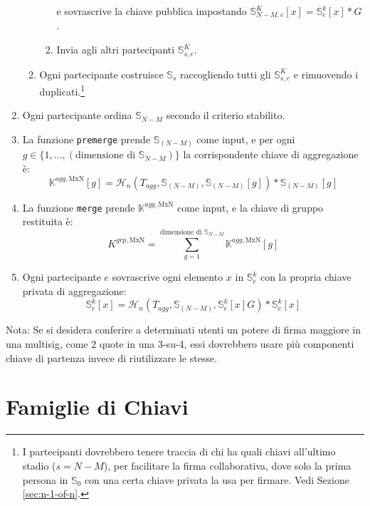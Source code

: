 \begin{enumerate}
\begin{enumerate}
\begin{enumerate}
            e sovrascrive la chiave pubblica impostando $\mathbb{S}^K_{N-M,e}[x] = \mathbb{S}^{k}_{e}[x]*G$.
            \item Invia agli altri partecipanti $\mathbb{S}^K_{s,e}$.
        \end{enumerate}
        \item Ogni partecipante costruisce $\mathbb{S}_{s}$ raccogliendo tutti gli $\mathbb{S}^K_{s,e}$ e rimuovendo i duplicati.\footnote{I partecipanti dovrebbero tenere traccia di chi ha quali chiavi all'ultimo stadio ($s = N-M$), per facilitare la firma collaborativa, dove solo la prima persona in $\mathbb{S}_0$ con una certa chiave privata la usa per firmare. Vedi Sezione \ref{sec:n-1-of-n}.}
    \end{enumerate}
    \item Ogni partecipante ordina $\mathbb{S}_{N-M}$ secondo il criterio stabilito.
    \item La funzione {\tt premerge} prende $\mathbb{S}_{(N-M)}$ come input, e per ogni \(g \in \{1,...,(\textrm{dimensione di }\mathbb{S}_{N-M})\}\) la corrispondente chiave di aggregazione è:\vspace{.175cm}
    \[\mathbb{K}^{agg,\textrm{MxN}}[g] = \mathcal{H}_n(T_{agg},\mathbb{S}_{(N-M)},\mathbb{S}_{(N-M)}[g])*\mathbb{S}_{(N-M)}[g]\]
    \item La funzione {\tt merge} prende $\mathbb{K}^{agg,\textrm{MxN}}$ come input, e la chiave di gruppo restituita è:\vspace{.175cm}
    \[K^{grp,\textrm{MxN}} = \sum^{\textrm{dimensione di }\mathbb{S}_{N-M}}_{g = 1} \mathbb{K}^{agg,\textrm{MxN}}[g]\]
    \item Ogni partecipante $e$ sovrascrive ogni elemento $x$ in $\mathbb{S}^k_{e}$ con la propria chiave privata di aggregazione:\vspace{.175cm}
    \[ \mathbb{S}^k_{e}[x] = \mathcal{H}_n(T_{agg},\mathbb{S}_{(N-M)},\mathbb{S}^k_{e}[x] G)*\mathbb{S}^k_{e}[x] \]
\end{enumerate}

Nota: Se si desidera conferire a determinati utenti un potere di firma maggiore in una multisig, come 2 quote in una 3-su-4, essi dovrebbero usare più componenti chiave di partenza invece di riutilizzare le stesse.



\section{Famiglie di Chiavi}
\label{sec:general-key-families}

